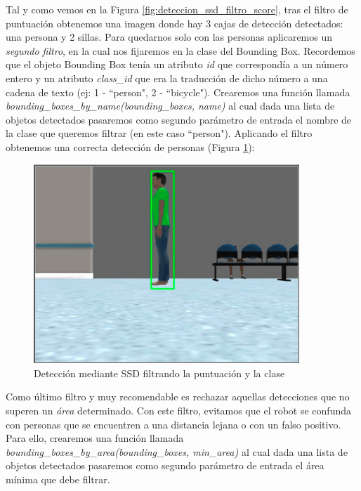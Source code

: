 Tal y como vemos en la Figura \ref{fig:deteccion_ssd_filtro_score}, tras el filtro de puntuación obtenemos una imagen donde hay 3 cajas de detección detectados: una persona y 2 sillas. Para quedarnos solo con las personas aplicaremos un \textit{segundo filtro}, en la cual nos fijaremos en la clase del Bounding Box. Recordemos que el objeto Bounding Box tenía un atributo \textit{id} que correspondía a un número entero y un atributo \textit{class\_id} que era la traducción de dicho número a una cadena de texto (ej: 1 - ``person", 2 - ``bicycle"). Crearemos una función llamada \textit{bounding\_boxes\_by\_name(bounding\_boxes, name)} al cual dada una lista de objetos detectados pasaremos como segundo parámetro de entrada el nombre de la clase que queremos filtrar (en este caso ``person"). Aplicando el filtro obtenemos una correcta detección de personas (Figura \ref{fig:deteccion_ssd_filtro_score_class}):\\

\begin{figure} [H]
  \begin{center}
    \includegraphics[width=10cm]{imagenes/cap6/deteccion-ssd-filtro-score-class.png}
  \end{center}
  \caption[Detección mediante SSD filtrando la puntuación y la clase]{Detección mediante SSD filtrando la puntuación y la clase}
  \label{fig:deteccion_ssd_filtro_score_class}
\end{figure}

Como último filtro y muy recomendable es rechazar aquellas detecciones que no superen un \textit{área} determinado. Con este filtro, evitamos que el robot se confunda con personas que se encuentren a una distancia lejana o con un falso positivo. Para ello, crearemos una función llamada \textit{bounding\_boxes\_by\_area(bounding\_boxes, min\_area)} al cual dada una lista de objetos detectados pasaremos como segundo parámetro de entrada el área mínima que debe filtrar.\\

